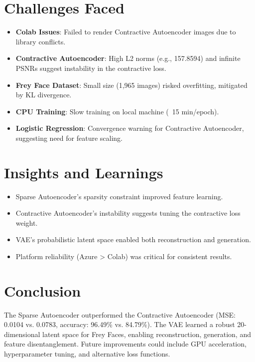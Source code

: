 \documentclass[12pt]{article}
\begin{document}
	\section{Challenges Faced}
	\begin{itemize}
		\item \textbf{Colab Issues}: Failed to render Contractive Autoencoder images due to library conflicts.
		\item \textbf{Contractive Autoencoder}: High L2 norms (e.g., 157.8594) and infinite PSNRs suggest instability in the contractive loss.
		\item \textbf{Frey Face Dataset}: Small size (1,965 images) risked overfitting, mitigated by KL divergence.
		\item \textbf{CPU Training}: Slow training on local machine (~15 min/epoch).
		\item \textbf{Logistic Regression}: Convergence warning for Contractive Autoencoder, suggesting need for feature scaling.
	\end{itemize}
	
	\section{Insights and Learnings}
	\begin{itemize}
		\item Sparse Autoencoder's sparsity constraint improved feature learning.
		\item Contractive Autoencoder's instability suggests tuning the contractive loss weight.
		\item VAE's probabilistic latent space enabled both reconstruction and generation.
		\item Platform reliability (Azure > Colab) was critical for consistent results.
	\end{itemize}
	
	\section{Conclusion}
	The Sparse Autoencoder outperformed the Contractive Autoencoder (MSE: 0.0104 vs. 0.0783, accuracy: 96.49\% vs. 84.79\%). The VAE learned a robust 20-dimensional latent space for Frey Faces, enabling reconstruction, generation, and feature disentanglement. Future improvements could include GPU acceleration, hyperparameter tuning, and alternative loss functions.
	
\end{document}
